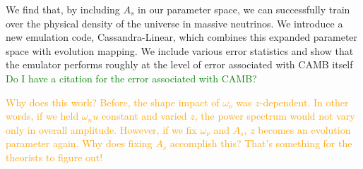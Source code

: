 We find that, by including $A_s$ in our parameter space, we can successfully 
train over the physical density of the universe in massive neutrinos. We introduce a new emulation code,
Cassandra-Linear, which combines this expanded parameter space with evolution
mapping. We include various error statistics and show that the emulator
performs roughly at the level of error associated with CAMB itself
\textcolor{green}{Do I have a citation for the error associated with CAMB?}

\textcolor{orange}{Why does this work? Before, the shape impact of
$\omega_\nu$ 
was $z$-dependent. In other words, if we held $\omega_nu$ constant and varied
$z$, the power spectrum would not vary only in overall amplitude. However, if
we fix $\omega_\nu$ and $A_s$, $z$ becomes an evolution parameter again. Why
does fixing $A_s$ accomplish this? That's something for the theorists to 
figure out!}
